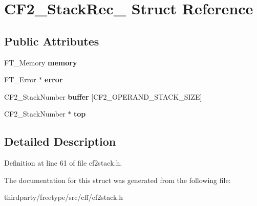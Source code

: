 \hypertarget{struct_c_f2___stack_rec__}{}\section{C\+F2\+\_\+\+Stack\+Rec\+\_\+ Struct Reference}
\label{struct_c_f2___stack_rec__}
\subsection*{Public Attributes}
\begin{DoxyCompactItemize}
\item 
\mbox{\label{struct_c_f2___stack_rec___a880701944e594f978aff99d217cc4899}} 
F\+T\+\_\+\+Memory {\bfseries memory}
\item 
\mbox{\label{struct_c_f2___stack_rec___adc203c76a21f137d30cd65ac59bf3218}} 
F\+T\+\_\+\+Error $\ast$ {\bfseries error}
\item 
\mbox{\label{struct_c_f2___stack_rec___a93bd51c26e3f5ccbfafcff51f4a40fdd}} 
C\+F2\+\_\+\+Stack\+Number {\bfseries buffer} \mbox{[}C\+F2\+\_\+\+O\+P\+E\+R\+A\+N\+D\+\_\+\+S\+T\+A\+C\+K\+\_\+\+S\+I\+ZE\mbox{]}
\item 
\mbox{\label{struct_c_f2___stack_rec___a47ed15c7a113befa0358afcdf54b4d4b}} 
C\+F2\+\_\+\+Stack\+Number $\ast$ {\bfseries top}
\end{DoxyCompactItemize}


\subsection{Detailed Description}


Definition at line 61 of file cf2stack.\+h.



The documentation for this struct was generated from the following file\+:\begin{DoxyCompactItemize}
\item 
thirdparty/freetype/src/cff/cf2stack.\+h\end{DoxyCompactItemize}
